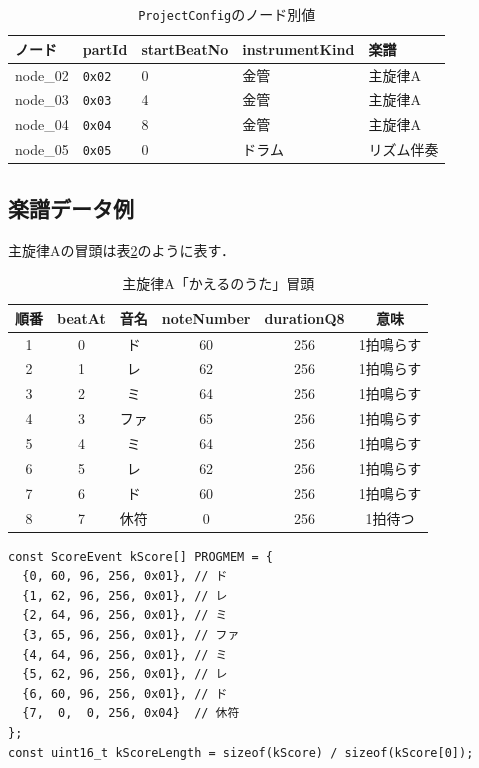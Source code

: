 \documentclass[uplatex,dvipdfmx]{jlreq}
\newcommand{\code}[1]{\texttt{#1}}
\begin{document}
\begin{table}[h]
\centering
\caption{\code{ProjectConfig}のノード別値}
\label{tab:config-values}
\begin{tabular}{p{}p{}p{}p{}p{}}
\toprule
\textbf{ノード} & \textbf{partId} & \textbf{startBeatNo} & \textbf{instrumentKind} & \textbf{楽譜} \\
\midrule
node\_02 & \code{0x02} & 0 & 金管 & 主旋律A \\
node\_03 & \code{0x03} & 4 & 金管 & 主旋律A \\
node\_04 & \code{0x04} & 8 & 金管 & 主旋律A \\
node\_05 & \code{0x05} & 0 & ドラム & リズム伴奏 \\
\bottomrule
\end{tabular}
\end{table}

\subsection{楽譜データ例}

主旋律Aの冒頭は表\ref{tab:melody}のように表す．

\begin{table}[h]
\centering
\caption{主旋律A「かえるのうた」冒頭}
\label{tab:melody}
\begin{tabular}{cccccc}
\toprule
\textbf{順番} & \textbf{beatAt} & \textbf{音名} & \textbf{noteNumber} & \textbf{durationQ8} & \textbf{意味} \\
\midrule
1 & 0 & ド & 60 & 256 & 1拍鳴らす \\
2 & 1 & レ & 62 & 256 & 1拍鳴らす \\
3 & 2 & ミ & 64 & 256 & 1拍鳴らす \\
4 & 3 & ファ & 65 & 256 & 1拍鳴らす \\
5 & 4 & ミ & 64 & 256 & 1拍鳴らす \\
6 & 5 & レ & 62 & 256 & 1拍鳴らす \\
7 & 6 & ド & 60 & 256 & 1拍鳴らす \\
8 & 7 & 休符 & 0 & 256 & 1拍待つ \\
\bottomrule
\end{tabular}
\end{table}

\begin{verbatim}
const ScoreEvent kScore[] PROGMEM = {
  {0, 60, 96, 256, 0x01}, // ド
  {1, 62, 96, 256, 0x01}, // レ
  {2, 64, 96, 256, 0x01}, // ミ
  {3, 65, 96, 256, 0x01}, // ファ
  {4, 64, 96, 256, 0x01}, // ミ
  {5, 62, 96, 256, 0x01}, // レ
  {6, 60, 96, 256, 0x01}, // ド
  {7,  0,  0, 256, 0x04}  // 休符
};
const uint16_t kScoreLength = sizeof(kScore) / sizeof(kScore[0]);
\end{verbatim}
\end{document}
